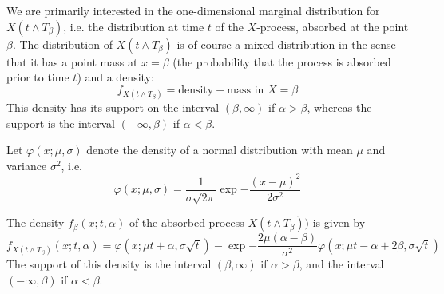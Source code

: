 We are primarily interested in the one-dimensional marginal distribution for $X(t\wedge T_{\beta})$, i.e. the distribution at time $t$ of the $X$-process, absorbed at the point $\beta$. The distribution of $X(t\wedge T_{\beta})$ is of course a mixed distribution in the sense that it has a point mass at $x = \beta$ (the probability that the process is absorbed prior to time $t$) and a density:
\begin{equation}
    f_{X(t\wedge T_{\beta})} = \text{density} + \text{mass in }X= \beta
\end{equation}
This density has its support on the interval $(\beta,\infty)$ if $\alpha > \beta$, whereas the support is the interval $(-\infty,\beta)$ if $\alpha < \beta$. 
\begin{definition}
    Let $\varphi(x;\mu, \sigma)$ denote the density of a normal distribution with mean $\mu$ and variance $\sigma^2$, i.e.
    \begin{equation}
        \varphi(x;\mu, \sigma) = \frac{1}{\sigma\sqrt{2\pi}}\exp{-\frac{(x-\mu)^2}{2\sigma^2}}
    \end{equation}
\end{definition}
\begin{proposition}\label{f}
    The density $f_{\beta}(x;t,\alpha)$ of the absorbed process $X(t\wedge T_{\beta}))$ is given by
    \begin{equation}
        f_{X(t\wedge T_{\beta})}(x;t,\alpha) = \varphi(x;\mu t+ \alpha, \sigma\sqrt{t})-\exp{-\frac{2\mu(\alpha-\beta)}{\sigma^2}}\varphi(x;\mu t - \alpha + 2\beta, \sigma\sqrt{t})
    \end{equation}
    The support of this density is the interval $(\beta,\infty)$ if $\alpha > \beta$, and the interval $(-\infty,\beta)$ if $\alpha < \beta$.
\end{proposition}

